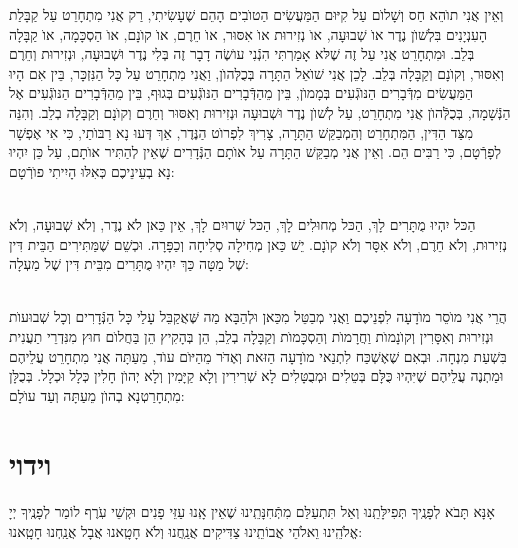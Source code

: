 \documentclass[twoside, openany, parskip=half, 11pt]{book}
\begin{document}
 וְאֵין אֲנִי תוׂהֵא חַס וְשָׁלוׂם עַל קִיּוּם הַמַּעֲשִׂים הַטוׂבִים הָהֵם שֶׁעָשִׂיתִי, רַק אֲנִי מִתְחָרֵט עַל קַבָּלַת הָעִנְיָנִים בִּלְשׁוׂן נֶדֶר אוׂ שְׁבוּעָה, אוׂ נְזִירוּת אוׂ אִסּוּר, אוׂ חֵרֶם, אוׂ קוׂנָם, אוׂ הַסְכָּמָה, אוׂ קַבָּלָה בְּלֵב. וּמִתְחָרֵט אֲנִי עַל זֶה שֶׁלּא אָמַרְתִּי הִנְֿנִי עוׂשֶׂה דָבָר זֶה בְּלִי נֶדֶר וּשְׁבוּעָה, וּנְזִירוּת וְחֵרֶם וְאִסּוּר, וְקוׂנָם וְקַבָּלָה בְּלֵב. לָכֵן אֲנִי שׁוׂאֵל הַתָּרָה בְּכֻלְּהוׂן, וַאֲנִי מִתְחָרֵט עַל כָּל הַנִּזְכָּר, בֵּין אִם הָיוּ הַמַּעֲשִׂים מִדְּֿבָרִים הַנּוׂגְֿעִים בְּמָמוׂן, בֵּין מֵהַדְּֿבָרִים הַנּוׂגְֿעִים בְּגוּף, בֵּין מֵהַדְּֿבָרִים הַנּוׂגְֿעִים אֶל הַנְּֿשָׁמָה, בְּכֻלְּֿהוׂן אֲנִי מִתְחָרֵט, עַל לְשׁוׂן נֶדֶר וּשְׁבוּעָה וּנְזִירוּת וְאִסּוּר וְחֵרֶם וְקוׂנָם וְקַבָּלָה בְלֵב. וְהִנֵּה מִצַּד הַדִּין, הַמִּתְחָרֵט וְהַמְבַקֵּשׁ הַתָּרָה, צָרִיךְ לִפְרוׂט הַנֶּדֶר, אַךְ דְּעוּ נָא רַבּוׂתַי, כִּי אִי אֶפְשָׁר לְפָרְֿטָם, כִּי רַבִּים הֵם. וְאֵין אֲנִי מְבַקֵּשׁ הַתָּרָה עַל אוׂתָם הַנְּֿדָרִים שֶׁאֵין לְהַתִּיר אוׂתָם, עַל כֵּן יִהְיוּ נָא בְעֵינֵיכֶם כְּאִלּוּ הָיִיתִי פוׂרְֿטָם:

\\
הַכּל יִהְיוּ מֻתָּרִים לָךְ, הַכּל מְחוּלִים לָךְ, הַכּל שְׁרוּיִם לָךְ, אֵין כַּאן לֺא נֶדֶר, וְלֺא שְׁבוּעָה, וְלֺא נְזִירוּת, וְלֺא חֵרֶם, וְלֺא אִסָּר וְלֺא קוׂנָם. יֵשׁ כַּאן מְחִילָה סְלִיחָה וְכַפָּרָה. וּכְשֵׁם שֶׁמַּתִּירִים הַבֵּית דִּין שֶׁל מַטָּה כַּךְ יִהְיוּ מֻתָּרִים מִבֵּית דִּין שֶׁל מַעְלָה:

\\
הֲרֵי אֲנִי מוֺסֵר מוׂדָעָה לִפְנֵיכֶם וַאֲנִי מְבַטֵּל מִכַּאן וּלְהַבָּא מַה שֶּׁאֲקַבֵּל עָלַי כָּל הַנְּֿדָרִים וְכָל שְׁבוּעוׂת וּנְזִירוּת וְאִסָּרִין וְקוׂנָמוׂת וַחֲרָמוׂת וְהַסְכָּמוׂת וְקַבָּלָה בְלֵב, הֵן בְּהָקִיץ הֵן בַּחֲלוׂם חוּץ מִנִּדְרֵי תַעֲנִית בִּשְׁעַת מִנְחָה. וּבְאִם שֶׁאֶשְׁכַּח לִתְנַאי מוׂדָעָה הַזּאת וְאֶדּׂר מֵהַיּוׂם עוׂד, מֵעַתָּה אֲנִי מִתְחָרֵט עֲלֵיהֶם וּמַתְנֶה עֲלֵיהֶם שֶׁיִּהְיוּ כֻּלָּם בְּטֵלִים וּמְבֻטָּלִים לָא שְׁרִירִין וְלָא קַיָּמִין וְלָא יְהוׂן חָלִין כְּלָל וּכְלָל. בְּכֻלָּן מִתְחָרַטְנָא בְהוׂן מֵעַתָּה וְעַד עוׂלָם:

\vfill
\sepline

\chapter[וידוי]{ וידוי }

אָנָּא תָּבֹא לְפָנֶֽיךָ תְּפִילָּתֵֽנוּ וְאַל תִּתְעַלַּם מִתְּֿחִנָּתֵֽינוּ שֶׁאֵין אָֽנוּ עַזֵּי פָנִים וּקְשֵׁי עֹֽרֶף לוֹמַר לְפָנֶֽיךָ יְיָ אֱלֹהֵֽינוּ וֵאלֹהֵי אֲבוֹתֵֽינוּ צַדִּיקִים אֲנַֽחֲנוּ וְלֹא חָטָֽאנוּ אֲבָל אֲנַֽחְנוּ חָטָֽאנוּ: 
\end{document}
